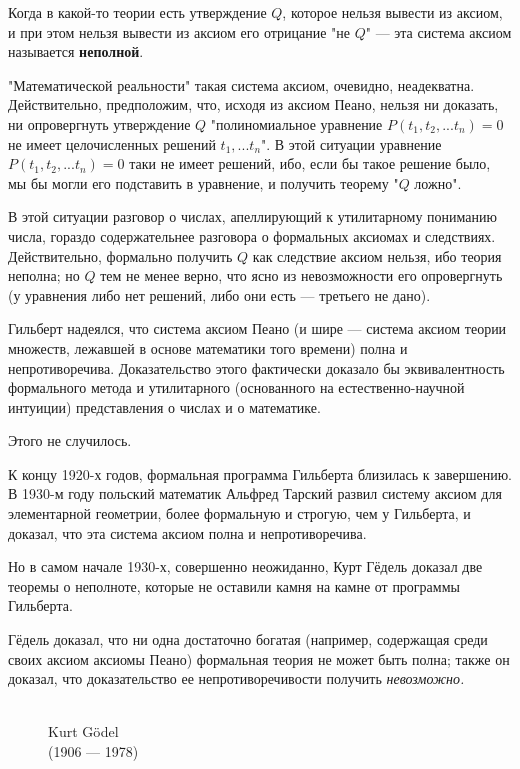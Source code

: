 \documentclass[12pt]{book}
\theoremstyle{upshape}
\theoremstyle{generic}
\theoremstyle{upshapenonumber}
\newcommand{\следствие}{%
     \refstepcounter{teorema}
     {\noindent\bf Следствие \thechapter.\arabic{teorema}:\ }}
\newcommand{\пример}{%
     \refstepcounter{teorema}
     {\noindent\bf Пример \thechapter.\arabic{teorema}:\ }}
\newcommand{\лемма}{%
     \refstepcounter{teorema}
     {\noindent\bf Лемма \thechapter.\arabic{teorema}:\ }}
\newcommand{\теорема}{%
     \refstepcounter{teorema}
     {\noindent\bf Теорема \thechapter.\arabic{teorema}:\ }}
\newcommand{\утверждение}{%
     \refstepcounter{teorema}
     {\noindent\bf Утверждение \thechapter.\arabic{teorema}:\ }}
\begin{document}
Когда в какой-то теории есть утверждение $Q$,
которое нельзя вывести из аксиом, и при этом 
нельзя вывести из аксиом его отрицание "не $Q$" --- эта
система аксиом называется {\bf неполной}.

"Математической реальности" такая система
аксиом, очевидно, неадекватна. Действительно, предположим,
что, исходя из аксиом Пеано, нельзя ни доказать,
ни опровергнуть утверждение $Q$ "полиномиальное
уравнение $P(t_1, t_2, ... t_n)=0$ 
не имеет целочисленных решений $t_1, ... t_n$".
В этой ситуации уравнение $P(t_1, t_2, ... t_n)=0$ 
таки не имеет решений, ибо, если бы такое решение
было, мы бы могли его подставить в уравнение,
и получить теорему "$Q$ ложно".

В этой ситуации разговор о числах, апеллирующий
к утилитарному пониманию числа, гораздо содержательнее
разговора о формальных аксиомах и следствиях.
Действительно, формально получить $Q$
как следствие аксиом нельзя, ибо теория неполна;
но $Q$ тем не менее верно, что ясно из невозможности
его опровергнуть (у уравнения либо нет решений, 
либо они есть --- третьего не дано).

Гильберт надеялся, что система аксиом Пеано
(и шире --- система аксиом теории множеств, лежавшей
в основе математики того времени) полна и непротиворечива.
Доказательство этого фактически доказало бы эквивалентность
формального метода и утилитарного (основанного
на естественно-научной интуиции) представления 
о числах и о математике.

Этого не случилось.

К концу 1920-х годов, формальная программа
Гильберта близилась к завершению. В 1930-м
году польский математик Альфред Тарский развил систему
аксиом для элементарной геометрии, более формальную
и строгую, чем у Гильберта, и доказал, что эта система
аксиом полна и непротиворечива.

Но в самом начале 1930-х, совершенно неожиданно,
Курт Гёдель доказал две теоремы о неполноте,
которые не оставили камня на камне от программы
Гильберта. 

Гёдель доказал, что ни одна достаточно
богатая (например, содержащая среди своих 
аксиом аксиомы Пеано) формальная теория не может быть полна; также
он доказал, что доказательство ее непротиворечивости
получить {\em невозможно.}

 \begin{figure}[ht]
\begin{center}
\\
{Kurt G\"odel\\
(1906 --- 1978)}
\end{center}
\end{figure}
\end{document}
